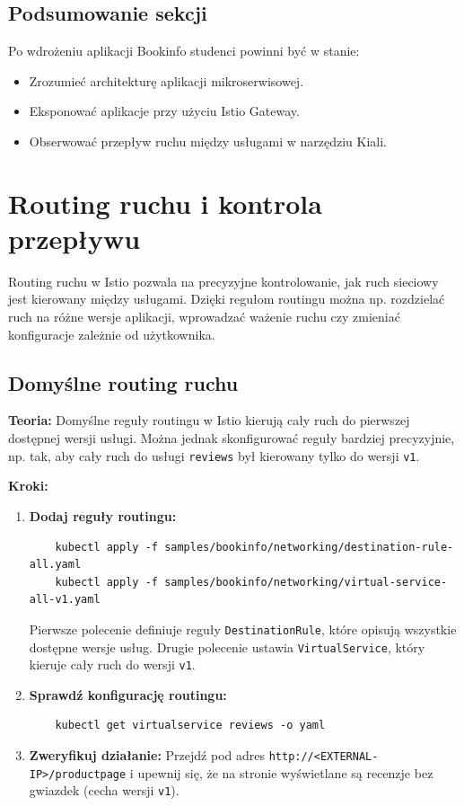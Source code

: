 \documentclass{article}
\begin{document}
\subsection{Podsumowanie sekcji}

Po wdrożeniu aplikacji Bookinfo studenci powinni być w stanie:
\begin{itemize}
    \item Zrozumieć architekturę aplikacji mikroserwisowej.
    \item Eksponować aplikacje przy użyciu Istio Gateway.
    \item Obserwować przepływ ruchu między usługami w narzędziu Kiali.
\end{itemize}

\section{Routing ruchu i kontrola przepływu}

Routing ruchu w Istio pozwala na precyzyjne kontrolowanie, jak ruch sieciowy jest kierowany między usługami. Dzięki regułom routingu można np. rozdzielać ruch na różne wersje aplikacji, wprowadzać ważenie ruchu czy zmieniać konfiguracje zależnie od użytkownika.

\subsection{Domyślne routing ruchu}

\textbf{Teoria:}
Domyślne reguły routingu w Istio kierują cały ruch do pierwszej dostępnej wersji usługi. Można jednak skonfigurować reguły bardziej precyzyjnie, np. tak, aby cały ruch do usługi \texttt{reviews} był kierowany tylko do wersji \texttt{v1}.

\textbf{Kroki:}
\begin{enumerate}
    \item \textbf{Dodaj reguły routingu:}
    \begin{lstlisting}
    kubectl apply -f samples/bookinfo/networking/destination-rule-all.yaml
    kubectl apply -f samples/bookinfo/networking/virtual-service-all-v1.yaml
    \end{lstlisting}
    Pierwsze polecenie definiuje reguły \texttt{DestinationRule}, które opisują wszystkie dostępne wersje usług. Drugie polecenie ustawia \texttt{VirtualService}, który kieruje cały ruch do wersji \texttt{v1}.

    \item \textbf{Sprawdź konfigurację routingu:}
    \begin{lstlisting}
    kubectl get virtualservice reviews -o yaml
    \end{lstlisting}

    \item \textbf{Zweryfikuj działanie:}
    Przejdź pod adres \texttt{http://<EXTERNAL-IP>/productpage} i upewnij się, że na stronie wyświetlane są recenzje bez gwiazdek (cecha wersji \texttt{v1}).
\end{enumerate}
\end{document}
